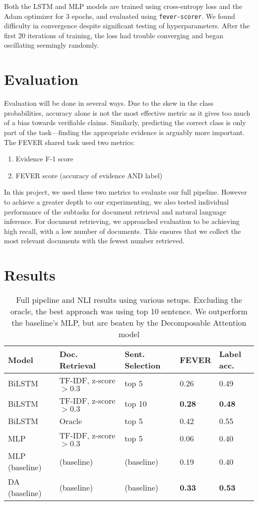 \documentclass[11pt,a4paper]{article}
\begin{document}
Both the LSTM and MLP models are trained using cross-entropy loss and the Adam optimizer\cite{adam}
for 3 epochs\footnotemark, and evaluated using \texttt{fever-scorer}\footnotemark. We found difficulty in convergence despite significant testing of hyperparameters. After the first 20 iterations of training, the loss had trouble converging and began oscillating seemingly randomly.


\section{Evaluation}

Evaluation will be done in several ways. Due to the skew in the class probabilities, accuracy alone is not the most effective metric as it gives too much of a bias towards verifiable claims. Similarly, predicting the correct class is only part of the task---finding the appropriate evidence is arguably more important. The FEVER shared task used two metrics:
\begin{enumerate}
  \item Evidence F-1 score
  \item FEVER score (accuracy of evidence AND label)
\end{enumerate}
In this project, we used these two metrics to evaluate our full pipeline. However to achieve a greater depth to our experimenting, we also tested individual performance of the subtasks for document retrieval and natural language inference. For document retrieving, we approached evaluation to be achieving high recall, with a low number of documents. This ensures that we collect the most relevant documents with the fewest number retrieved.


\section{Results}
\begin{table*}[h]
  \centering
  \begin{tabular}{lllll}
    \toprule
    Model  & Doc. Retrieval & Sent. Selection & FEVER & Label acc. \\
    \midrule
    BiLSTM & TF-IDF, z-score $> 0.3$ & top 5 & 0.26 & 0.49 \\
    BiLSTM & TF-IDF, z-score $> 0.3$ & top 10 & \textbf{0.28} & \textbf{0.48} \\
    BiLSTM & Oracle & top 5 & 0.42 & 0.55 \\
    MLP & TF-IDF, z-score $> 0.3$ & top 5 & 0.06 & 0.40 \\
    MLP (baseline) & (baseline) & (baseline) & 0.19 & 0.40 \\
    DA (baseline) & (baseline) & (baseline) & \textbf{0.33} & \textbf{0.53} \\
    \bottomrule
  \end{tabular}
  \caption{Full pipeline and NLI results using various setups. Excluding the oracle, the best approach was using top 10 sentence. We outperform the baseline's MLP, but are beaten by the Decomposable Attention model \cite{parikh2016decomposable}}
  \label{tab:full-pipeline}
\end{table*}
\end{document}
